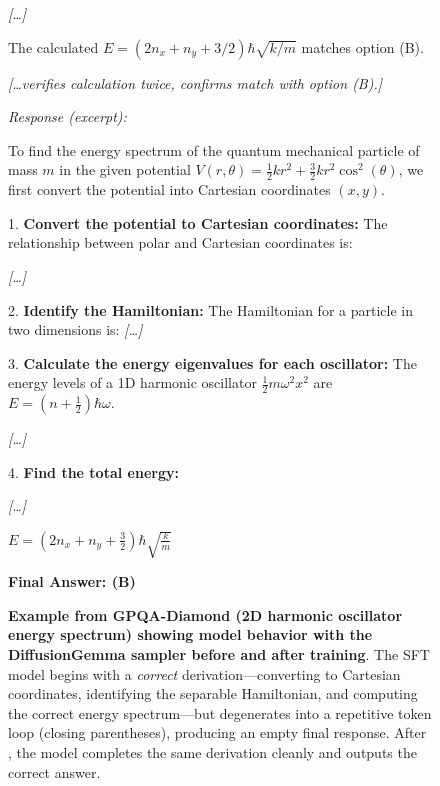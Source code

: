 \begin{figure}[t]
\begin{minipage}[t]{0.49\textwidth}
\begin{mdframed}[style=afterbox]
\begin{mdframed}[style=thinkbox]
\textit{[\ldots]}

The calculated $E = (2n_x+n_y+3/2)\hbar\sqrt{k/m}$ matches option (B).
   
\textit{[\ldots verifies calculation twice, confirms match with option (B).]}
\end{mdframed}
\smallskip
\noindent\textit{Response (excerpt):}
\begin{mdframed}[style=thinkbox]
To find the energy spectrum of the quantum mechanical particle of mass $m$ in the given potential $V(r, \theta) = \frac{1}{2}kr^2 + \frac{3}{2}kr^2\cos^2(\theta)$, we first convert the potential into Cartesian coordinates $(x, y)$.

1.  \textbf{Convert the potential to Cartesian coordinates:}
    The relationship between polar and Cartesian coordinates is:

\textit{[\ldots]}



2.  \textbf{Identify the Hamiltonian:}
    The Hamiltonian for a particle in two dimensions is: \textit{[\ldots]}


3.  \textbf{Calculate the energy eigenvalues for each oscillator:}
    The energy levels of a 1D harmonic oscillator $\frac{1}{2}m\omega^2x^2$ are $E = (n+\frac{1}{2})\hbar\omega$.

\textit{[\ldots]}

4.  \textbf{Find the total energy:}

\textit{[\ldots]}

\quad $E = (2n_x + n_y + \frac{3}{2})\hbar\sqrt{\frac{k}{m}}$

\textbf{Final Answer: (B)}
\end{mdframed}
\end{mdframed}
\end{minipage}
\caption{\textbf{Example from GPQA-Diamond (2D harmonic oscillator energy spectrum) showing model behavior with the DiffusionGemma sampler before and after \sdrl training}. The SFT model begins with a \emph{correct} derivation---converting to Cartesian coordinates, identifying the separable Hamiltonian, and computing the correct energy spectrum---but degenerates into a repetitive token loop (closing parentheses), producing an empty final response. After \sdrl, the model completes the same derivation cleanly and outputs the correct answer.}
\label{fig:gpqa-rl-example-quantum}
\end{figure}
